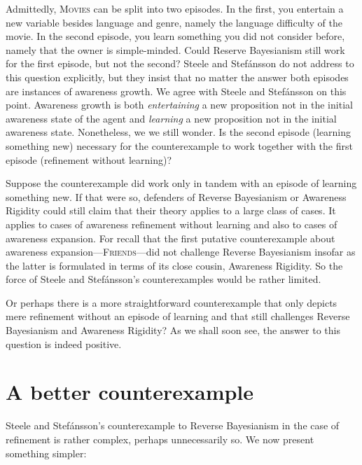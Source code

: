 \documentclass[
  11pt,
  dvipsnames,enabledeprecatedfontcommands]{scrartcl}
\begin{document}
\noindent  Admittedly, \textsc{Movies} can be split into two episodes.
In the first, you entertain a new variable besides language and genre,
namely the language difficulty of the movie. In the second episode, you
learn something you did not consider before, namely that the owner is
simple-minded. Could Reserve Bayesianism still work for the first
episode, but not the second? Steele and Stefánsson do not address to
this question explicitly, but they insist that no matter the answer both
episodes are instances of awareness growth. We agree with Steele and
Stefánsson on this point. Awareness growth is both \textit{entertaining}
a new proposition not in the initial awareness state of the agent and
\textit{learning} a new proposition not in the initial awareness state.
Nonetheless, we we still wonder. Is the second episode (learning
something new) necessary for the counterexample to work together with
the first episode (refinement without learning)?

Suppose the counterexample did work only in tandem with an episode of
learning something new. If that were so, defenders of Reverse
Bayesianism or Awareness Rigidity could still claim that their theory
applies to a large class of cases. It applies to cases of awareness
refinement without learning and also to cases of awareness expansion.
For recall that the first putative counterexample about awareness
expansion---\textsc{Friends}---did not challenge Reverse Bayesianism
insofar as the latter is formulated in terms of its close cousin,
Awareness Rigidity. So the force of Steele and Stefánsson's
counterexamples would be rather limited.

Or perhaps there is a more straightforward counterexample that only
depicts mere refinement without an episode of learning and that still
challenges Reverse Bayesianism and Awareness Rigidity? As we shall soon
see, the answer to this question is indeed positive.

\hypertarget{a-better-counterexample}{%
\section{A better counterexample}\label{a-better-counterexample}}

\label{sec:better}

Steele and Stefánsson's counterexample to Reverse Bayesianism in the
case of refinement is rather complex, perhaps unnecessarily so. We now
present something simpler:
\end{document}

